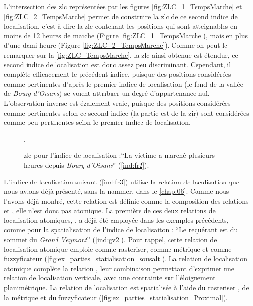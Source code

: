 L'intersection des \ac{zlc} représentées par les figures
\ref{fig:ZLC_1_TempsMarche} et \ref{fig:ZLC_2_TempsMarche} permet de
construire la \ac{zlc} de ce second indice de localisation,
c'est-à-dire la \ac{zlc} contenant les positions qui sont atteignables
en moins de 12 heures de marche (Figure \ref{fig:ZLC_1_TempsMarche}),
mais en plus d'une demi-heure (Figure
\ref{fig:ZLC_2_TempsMarche}). Comme on peut le remarquer sur la
\autoref{fig:ZLC_TempsMarche}, la \ac{zlc} ainsi obtenue est étendue,
ce second indice de localisation est donc assez peu
discriminant. Cependant, il complète efficacement le précédent indice,
puisque des positions considérées comme pertinentes d'après le premier
indice de localisation (\eg le fond de la vallée de
\emph{Bourg-d'Oisans}) se voient attribuer un degré d'appartenance
nul. L'observation inverse est également vraie, puisque des positions
considérées comme pertinentes selon ce second indice (\eg la partie
est de la \ac{zir}) sont considérées comme peu pertinentes selon le
premier indice de localisation.

\begin{figure}[htb]
  \centering
  
  \caption{\ac{zlc} pour l'indice de localisation :\enquote{La victime
      a marché plusieurs heures depuis \emph{Bourg-d'Oisans}}
    (\ref{ind:fr2}).}
  \label{fig:ZLC_TempsMarche}.  
\end{figure}


L'indice de localisation suivant (\ref{ind:fr3}) utilise la relation
de localisation  que nous avions déjà
présenté, sans la nommer, dans le \autoref{chap:06}. Comme nous
l'avons déjà montré, cette relation est définie comme la composition
des relations  et ,
elle n'est donc pas atomique. La première de ces deux relations de
localisation atomiques, , a déjà été
employée dans les exemples précédents, comme pour la spatialisation de
l'indice de localisaiton : \enquote{Le requérant est
   du sommet du \emph{Grand Veymont}}
(\ref{ind:gv2}). Pour rappel, cette relation de localisation atomique
emploie  comme rasteriser,
 comme métrique et
 comme fuzzyficateur
(\autoref{fig:ex_parties_statialisation_sousalt}). La relation de
localisation atomique  complète la relation
, leur combinaison permettant d'exprimer une
relation de localisation verticale, avec une contrainte sur
l'éloignement planimétrique. La relation de localisation
 est spatialisée à l'aide du rasteriser
, de la métrique
 et du fuzzyficateur
(\autoref{fig:ex_parties_statialisation_Proximal}).

